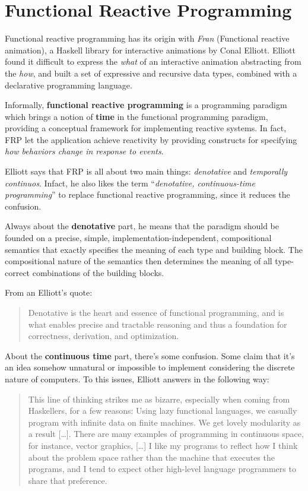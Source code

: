 \section{Functional Reactive
Programming}\label{functional-reactive-programming}

Functional reactive programming has its origin with \emph{Fran}
(Functional reactive animation), a Haskell library for interactive
animations by Conal Elliott. Elliott found it difficult to express the
\emph{what} of an interactive animation abstracting from the \emph{how},
and built a set of expressive and recursive data types, combined with a
declarative programming language.

Informally, \textbf{functional reactive programming} is a programming
paradigm which brings a notion of \textbf{time} in the functional
programming paradigm, providing a conceptual framework for implementing
reactive systems. In fact, FRP let the application achieve reactivity by
providing constructs for specifying \emph{how behaviors change in
response to events}.

Elliott says that FRP is all about two main things: \emph{denotative}
and \emph{temporally continuos}. Infact, he also likes the term
``\emph{denotative, continuous-time programming}'' to replace functional
reactive programming, since it reduces the confusion.

Always about the \textbf{denotative} part, he means that the paradigm
should be founded on a precise, simple, implementation-independent,
compositional semantics that exactly specifies the meaning of each type
and building block. The compositional nature of the semantics then
determines the meaning of all type-correct combinations of the building
blocks.

From an Elliott's quote: 

\begin{quote}
Denotative is the heart and
essence of functional programming, and is what enables precise and
tractable reasoning and thus a foundation for correctness, derivation,
and optimization.
\end{quote}

About the \textbf{continuous time} part, there's some confusion. Some
claim that it's an idea somehow unnatural or impossible to implement
considering the discrete nature of computers. To this issues, Elliott
answers in the following way:

\begin{quote}
This line of thinking strikes me as bizarre, especially when coming from
Haskellers, for a few reasons: Using lazy functional languages, we
casually program with infinite data on finite machines. We get lovely
modularity as a result {[}\ldots{}{]}. There are many examples of
programming in continuous space, for instance, vector graphics,
{[}\ldots{}{]} I like my programs to reflect how I think about the
problem space rather than the machine that executes the programs, and I
tend to expect other high-level language programmers to share that
preference.
\end{quote}

